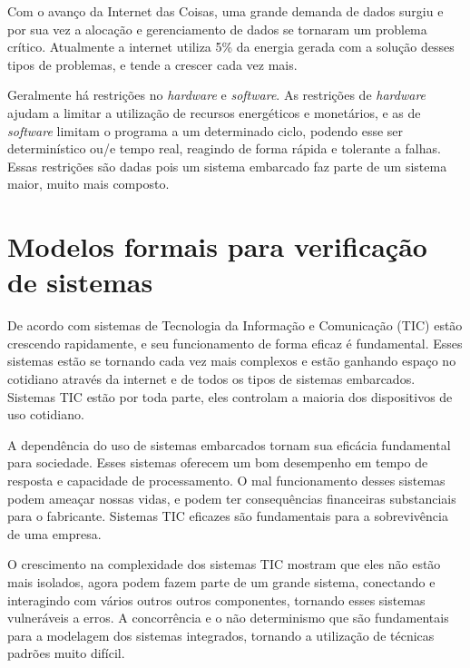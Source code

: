 Com o avanço da Internet das Coisas, uma grande demanda de dados surgiu e por sua vez a alocação e gerenciamento de dados se tornaram um problema crítico. Atualmente a internet utiliza 5\% da energia gerada com a solução desses tipos de problemas, e tende a crescer cada vez mais.\cite{Gubbi:2013} 

Geralmente há restrições no \textit{hardware} e \textit{software}. As restrições de \textit{hardware} ajudam a limitar a utilização de recursos energéticos e monetários, e as de \textit{software} limitam o programa a um determinado ciclo, podendo esse ser determinístico ou/e tempo real, reagindo de forma rápida e tolerante a falhas. Essas restrições são dadas pois um sistema embarcado faz parte de um sistema maior, muito mais composto. %

\section{Modelos formais para verificação de sistemas}
 
De acordo com  sistemas de Tecnologia da Informação e Comunicação (TIC) estão crescendo rapidamente, e seu funcionamento de forma eficaz é fundamental. Esses sistemas estão se tornando cada vez mais complexos e estão ganhando espaço no cotidiano através da internet e de todos os tipos de sistemas embarcados. Sistemas TIC estão por toda parte, eles controlam a maioria dos dispositivos de uso cotidiano.

A dependência do uso de sistemas embarcados tornam sua eficácia fundamental para sociedade. Esses sistemas oferecem um bom desempenho em tempo de resposta e capacidade de processamento. O mal funcionamento desses sistemas podem ameaçar nossas vidas, e podem ter consequências financeiras substanciais para o fabricante. Sistemas TIC eficazes são fundamentais para a sobrevivência de uma empresa.

O crescimento na complexidade dos sistemas TIC mostram que eles não estão mais isolados, agora podem fazem parte de um grande sistema, conectando e interagindo com vários outros outros componentes, tornando esses sistemas vulneráveis a erros. 
A concorrência e o não determinismo que são fundamentais para a modelagem dos sistemas integrados, tornando a utilização de técnicas padrões muito difícil.

